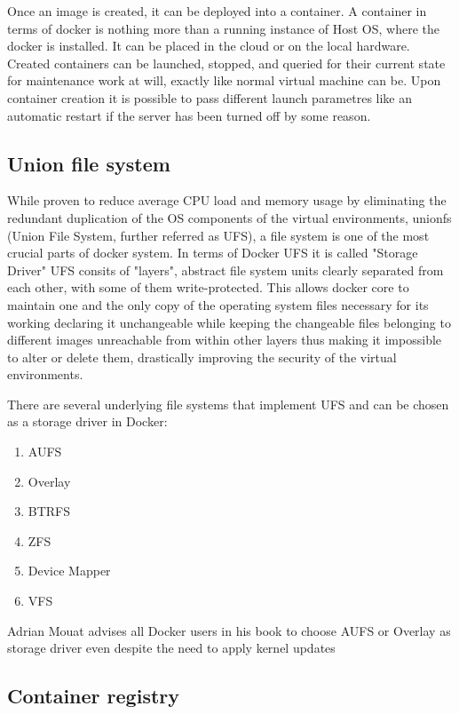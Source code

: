 Once an image is created, it can be deployed into a container. A
container in terms of docker is nothing more than a running
instance of Host OS, where the docker is installed. It can be placed
in the cloud or on the local hardware.
Created containers can be launched, stopped, and queried for their
current state for maintenance work at will, exactly like normal virtual
machine can be. Upon container creation it is possible to pass
different launch parametres like an automatic restart if the server
has been turned off by some reason.\cite{AdrMouContainerUsage:2016}

\subsection{Union file system}

While proven to reduce average CPU load and memory usage by
eliminating the redundant duplication of the OS components of the
virtual environments,
unionfs (Union File System, further referred as UFS), a file system
is one of the most crucial parts of docker system.
In terms of Docker UFS it is called "Storage Driver"\cite{AdrMouUFS:2016}
UFS consits of "layers", abstract file system units clearly separated
from each other, with some of them write-protected. This allows
docker core to maintain one and the only copy of the operating
system files necessary for its working declaring it unchangeable
while keeping the changeable files belonging to different images
unreachable from within other layers thus making it impossible to
alter or delete them, drastically improving the security of the virtual
environments.

There are several underlying file systems that
implement UFS and can be chosen as a storage
driver in Docker\cite{AdrMouUFS:2016}:
\begin{enumerate}
\item AUFS
\item Overlay
\item BTRFS
\item ZFS
\item Device Mapper
\item VFS
\end{enumerate}

Adrian Mouat advises all Docker users in his book
to choose AUFS or Overlay as storage
driver even despite the need
to apply kernel updates\cite{AdrMouUFSAdvise:2016}

\subsection{Container registry}

